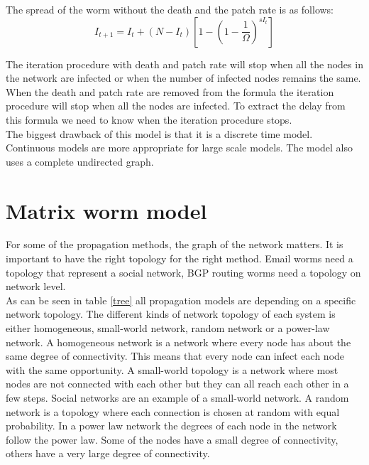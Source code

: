 The spread of the worm without the death and the patch rate is as follows:
\begin{equation}
I_{t+1}=I_{t}+(N-I_{t})[1-(1-\dfrac{1}{\Omega})^{sI_{t}}]
\end{equation}

The iteration procedure with death and patch rate will stop when all the nodes in the network are infected or when the number of infected nodes remains the same. When the death and patch rate are removed from the formula the iteration procedure will stop when all the nodes are infected. To extract the delay from this formula we need to know when the iteration procedure stops. \\
The biggest drawback of this model is that it is a discrete time model. Continuous models are more appropriate for large scale models. The model also uses a complete undirected graph.







\section{Matrix worm model}
\label{eigenmatrixmethode}
For some of the propagation methods, the graph of the network matters. It is important to have the right topology for the right method. Email worms need a topology that represent a social network, BGP routing worms need a topology on network level. \\

As can be seen in table \ref{tree} all propagation models are depending on a specific network topology. The different kinds of network topology of each system is either homogeneous, small-world network, random network or a power-law network. A homogeneous network is a network where every node has about the same degree of connectivity. This means that every node can infect each node with the same opportunity. A small-world topology is a network where most nodes are not connected with each other but they can all reach each other in a few steps. Social networks are an example of a small-world network. A random network is a topology where each connection is chosen at random with equal probability. In a power law network the degrees of each node in the network follow the power law. Some of the nodes have a small degree of connectivity, others have a very large degree of connectivity.\\

